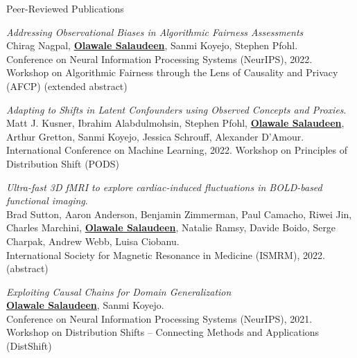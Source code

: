 \documentclass{resume} %
\begin{document}
\begin{rSection}{Peer-Reviewed Publications}
\begin{etaremune}[label={\arabic*.}]

\item \emph{Addressing Observational Biases in Algorithmic Fairness
Assessments}\\
Chirag Nagpal, \textbf{\underline{Olawale Salaudeen}}, Sanmi Koyejo, Stephen
Pfohl.\\
Conference on Neural Information Processing Systems (NeurIPS), 2022. Workshop
on Algorithmic Fairness through the Lens of Causality and Privacy (AFCP)
(extended abstract)

\item \emph{Adapting to Shifts in Latent Confounders using Observed
Concepts and Proxies}.\\
Matt J. Kusner, Ibrahim Alabdulmohsin, Stephen Pfohl, \textbf{\underline{Olawale Salaudeen}},
Arthur Gretton, Sanmi Koyejo, Jessica Schrouff, Alexander D’Amour.\\
International Conference on Machine Learning, 2022. Workshop on Principles of Distribution Shift (PODS)

\item \emph{Ultra-fast 3D fMRI to explore cardiac-induced fluctuations
in BOLD-based functional imaging}.\\
Brad Sutton, Aaron Anderson, Benjamin Zimmerman, Paul Camacho, Riwei Jin, Charles Marchini,
\textbf{\underline{Olawale Salaudeen}}, Natalie Ramsy, Davide Boido, Serge
Charpak, Andrew Webb, Luisa Ciobanu.\\
International Society for Magnetic Resonance in Medicine (ISMRM), 2022. (abstract)

\item \emph{Exploiting Causal Chains for Domain Generalization}\\
\textbf{\underline{Olawale Salaudeen}}, Sanmi Koyejo.\\
Conference on Neural Information Processing Systems (NeurIPS), 2021. Workshop on Distribution Shifts -- Connecting Methods and Applications (DistShift)
\end{etaremune}
\end{rSection}

\end{document}
